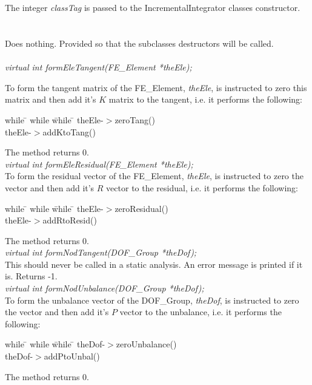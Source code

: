  \\
\\ 
The integer {\em classTag} is passed to the
IncrementalIntegrator classes constructor. \\

 \\
\\ 
Does nothing. Provided so that the subclasses destructors will be called.\\

\\
{\em virtual int formEleTangent(FE\_Element *theEle);} 

To form the tangent matrix of the FE\_Element, {\em theEle}, is
instructed to zero this matrix and then add it's $K$ matrix to the
tangent, i.e. it performs the following: 
\begin{tabbing}
while \= \+ while \= while \= \kill
theEle-$>$zeroTang() \\
theEle-$>$addKtoTang() 
\end{tabbing}
\noindent The method returns $0$. \\

{\em virtual int formEleResidual(FE\_Element *theEle);} \\
To form the residual vector of the FE\_Element, {\em theEle}, is
instructed to zero the vector and then add it's $R$ vector to
the residual, i.e. it performs the following: 
\begin{tabbing}
while \= \+ while \= while \= \kill
theEle-$>$zeroResidual() \\
theEle-$>$addRtoResid() 
\end{tabbing}
\noindent The method returns $0$. \\

{\em virtual int formNodTangent(DOF\_Group *theDof);} \\
This should never be called in a static analysis. An error message is
printed if it is. Returns -1. \\


{\em virtual int formNodUnbalance(DOF\_Group *theDof);} \\
To form the unbalance vector of the DOF\_Group, {\em theDof}, is
instructed to zero the vector and then add it's $P$ vector to the
unbalance, i.e. it performs the following: 
\begin{tabbing}
while \= \+ while \= while \= \kill
theDof-$>$zeroUnbalance() \\
theDof-$>$addPtoUnbal() 
\end{tabbing}
\noindent The method returns $0$. \\


